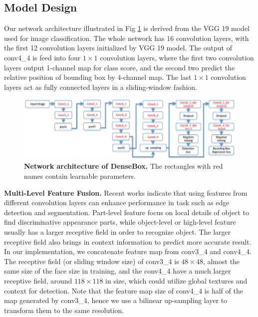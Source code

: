 \subsection{Model Design } 

Our network architecture illustrated in Fig \ref{fig:fig_net} is derived from the VGG 19 model used for image classification\cite{simonyan2014very}. The whole network has 16 convolution layers, with the first 12 convolution layers initialized by VGG 19 model.  The output of conv4\_4 is feed into four $1 \times 1$ convolution layers, where the first two convolution layers output 1-channel map for class score, and the second two predict the relative position of bounding box by 4-channel map.  The last $1 \times 1$ convolution layers act as fully connected layers in a sliding-window fashion.  


	\begin{figure}[!hbtp]
	\centering
	 \includegraphics[scale=0.55]{figures/figure3-crop.pdf}
	\caption{\textbf{Network architecture of DenseBox.} The rectangles with red names contain learnable parameters. }
	\label{fig:fig_net}
	\end{figure}



\textbf{Multi-Level Feature Fusion.} 
Recent works\cite{bertasius2014deepedge, liu2015parsenet} indicate that using features from different convolution layers can enhance performance in task such as edge detection and segmentation. Part-level feature focus on local details of object to find discriminative appearance parts, while object-level or high-level feature usually has a larger receptive field in order to recognize object. The larger receptive field also brings in context information to predict more accurate result. In our implementation, we concatenate feature map from conv3\_4 and conv4\_4. The receptive field (or sliding window size) of conv3\_4 is $48 \times 48$, almost the same size of the face size in training, and the conv4\_4 have a much larger receptive field, around $118 \times 118$ in size, which could utilize global textures and context for detection.  Note that the feature map size of conv4\_4 is half of the map generated by conv3\_4, hence we use a bilinear up-sampling layer to transform them to the same resolution. 

